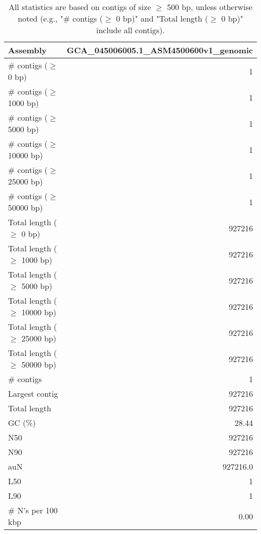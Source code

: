 \documentclass[12pt,a4paper]{article}
\begin{document}
\begin{table}[ht]
\begin{center}
\caption{All statistics are based on contigs of size $\geq$ 500 bp, unless otherwise noted (e.g., "\# contigs ($\geq$ 0 bp)" and "Total length ($\geq$ 0 bp)" include all contigs).}
\begin{tabular}{|l*{1}{|r}|}
\hline
Assembly & GCA\_045006005.1\_ASM4500600v1\_genomic \\ \hline
\# contigs ($\geq$ 0 bp) & 1 \\ \hline
\# contigs ($\geq$ 1000 bp) & 1 \\ \hline
\# contigs ($\geq$ 5000 bp) & 1 \\ \hline
\# contigs ($\geq$ 10000 bp) & 1 \\ \hline
\# contigs ($\geq$ 25000 bp) & 1 \\ \hline
\# contigs ($\geq$ 50000 bp) & 1 \\ \hline
Total length ($\geq$ 0 bp) & 927216 \\ \hline
Total length ($\geq$ 1000 bp) & 927216 \\ \hline
Total length ($\geq$ 5000 bp) & 927216 \\ \hline
Total length ($\geq$ 10000 bp) & 927216 \\ \hline
Total length ($\geq$ 25000 bp) & 927216 \\ \hline
Total length ($\geq$ 50000 bp) & 927216 \\ \hline
\# contigs & 1 \\ \hline
Largest contig & 927216 \\ \hline
Total length & 927216 \\ \hline
GC (\%) & 28.44 \\ \hline
N50 & 927216 \\ \hline
N90 & 927216 \\ \hline
auN & 927216.0 \\ \hline
L50 & 1 \\ \hline
L90 & 1 \\ \hline
\# N's per 100 kbp & 0.00 \\ \hline
\end{tabular}
\end{center}
\end{table}
\end{document}
